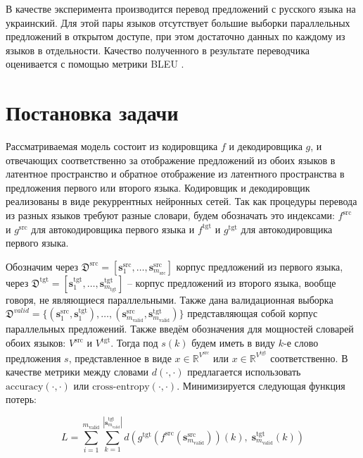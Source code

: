 \documentclass[12pt,twoside]{article}
\begin{document}
В качестве эксперимента производится перевод предложений с русского языка на украинский. Для этой пары языков отсутствует большие выборки параллельных предложений в открытом доступе, при этом достаточно данных по каждому из языков в отдельности. Качество полученного в результате переводчика оценивается с помощью метрики BLEU \cite{papineni2002bleu}. 

\section{Постановка задачи}

Рассматриваемая модель состоит из кодировщика $f$ и декодировщика $g$, и отвечающих соответственно за отображение предложений из обоих языков в латентное пространство и обратное отображение из латентного пространства в предложения первого или второго языка. Кодировщик и декодировщик реализованы в виде рекуррентных нейронных сетей. Так как процедуры перевода из разных языков требуют разные словари, будем обозначать это индексами: $f^{\text{src}}$ и $g^{\text{src}}$ для автокодировщика первого языка и $f^{\text{tgt}}$ и $g^{\text{tgt}}$ для автокодировщика первого языка.

Обозначим через $\mathfrak{D}^{\text{src}} = [\mathbf{s}_1^{\text{src}}, \dots, \mathbf{s}_{m_\text{src}}^{\text{src}}]$ корпус предложений из первого языка, через $\mathfrak{D}^{\text{tgt}} = [\mathbf{s}_1^{\text{tgt}}, \dots, \mathbf{s}_{m_\text{tgt}}^{\text{tgt}}]$ -- корпус предложений из второго языка, вообще говоря, не являющиеся параллельными. Также дана валидационная выборка $\mathfrak{D}^{valid} = \{(\mathbf{s}_1^{\text{src}}, \mathbf{s}_1^{\text{tgt}}), \dots, (\mathbf{s}_{m_\text{valid}}^{\text{src}}, \mathbf{s}_{m_\text{valid}}^{\text{tgt}})\}$ представляющая собой корпус параллельных предложений. Также введём обозначения для мощностей словарей обоих языков: $V^{\text{src}}$ и $V^{\text{tgt}}$. Тогда под $s(k)$ будем иметь в виду $k$-е слово предложения $s$, представленное в виде $x \in \mathbb{R}^{V^{\text{src}}}$ или $x \in \mathbb{R}^{V^{\text{tgt}}}$ соответственно. В качестве метрики между словами $d(\cdot, \cdot)$ предлагается использовать $\text{accuracy}(\cdot, \cdot)$ или $\text{cross-entropy}(\cdot, \cdot)$.
 Минимизируется следующая функция потерь:

\[ L = \sum_{i=1}^{m_\text{valid}} \sum_{k=1}^{|\mathbf{s}_{m_\text{valid}}^{\text{tgt}}|}d(g^{\text{tgt}}(f^{\text{src}}(\mathbf{s}_{m_\text{valid}}^{\text{src}}))(k), \; \mathbf{s}_{m_\text{valid}}^{\text{tgt}}(k))\]
\end{document}
